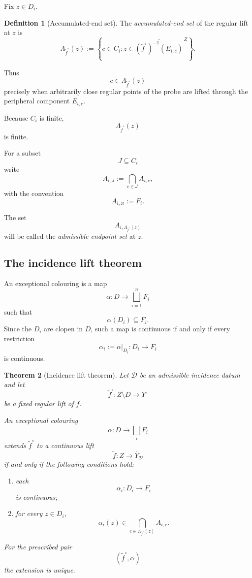 \documentclass[11pt]{article}
\theoremstyle{plain}
\newtheorem{theorem}{Theorem}[section]
\theoremstyle{definition}
\newtheorem{definition}[theorem]{Definition}
\begin{document}
Fix $z\in D_i$.

\begin{definition}[Accumulated-end set]
\label{def:accumulated-end-set}
The \emph{accumulated-end set} of the regular lift at $z$ is
\[
\Lambda_{\widetilde f^\circ}(z)
:=
\left\{
c\in C_i:
z\in
\overline{
(\widetilde f^\circ)^{-1}(E_{i,c})
}^{\,Z}
\right\}.
\]
\end{definition}

Thus
\[
c\in\Lambda_{\widetilde f^\circ}(z)
\]
precisely when arbitrarily close regular points of the probe are lifted
through the peripheral component $E_{i,c}$.

Because $C_i$ is finite,
\[
\Lambda_{\widetilde f^\circ}(z)
\]
is finite.

For a subset
\[
J\subseteq C_i
\]
write
\[
A_{i,J}
:=
\bigcap_{c\in J}A_{i,c},
\]
with the convention
\[
A_{i,\varnothing}:=F_i.
\]

The set
\[
A_{i,\Lambda_{\widetilde f^\circ}(z)}
\]
will be called the \emph{admissible endpoint set} at $z$.

\subsection{The incidence lift theorem}
\label{subsec:incidence-lift-theorem}

An exceptional colouring is a map
\[
\alpha:D\longrightarrow\bigsqcup_{i=1}^nF_i
\]
such that
\[
\alpha(D_i)\subseteq F_i.
\]
Since the $D_i$ are clopen in $D$, such a map is continuous if and only if
every restriction
\[
\alpha_i:=\alpha|_{D_i}:D_i\to F_i
\]
is continuous.

\begin{theorem}[Incidence lift theorem]
\label{thm:incidence-lift}
Let $\mathcal D$ be an admissible incidence datum and let
\[
\widetilde f^\circ:
Z\setminus D\to Y^\circ
\]
be a fixed regular lift of $f$.

An exceptional colouring
\[
\alpha:D\to\bigsqcup_iF_i
\]
extends $\widetilde f^\circ$ to a continuous lift
\[
\widetilde f:
Z\longrightarrow\overline Y_{\mathcal D}
\]
if and only if the following conditions hold:
\begin{enumerate}[label=(\roman*)]
\item each
\[
\alpha_i:D_i\to F_i
\]
is continuous;
\item for every $z\in D_i$,
\[
\alpha_i(z)
\in
\bigcap_{c\in
\Lambda_{\widetilde f^\circ}(z)}
A_{i,c}.
\]
\end{enumerate}
For the prescribed pair
\[
(\widetilde f^\circ,\alpha)
\]
the extension is unique.
\end{theorem}
\end{document}
